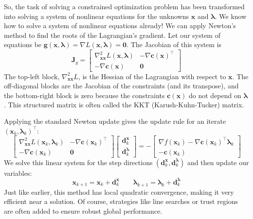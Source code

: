 So, the task of solving a constrained optimization problem has been transformed into solving a system of nonlinear equations for the unknowns $\mathbf{x}$ and $\boldsymbol{\lambda}$. We know how to solve a system of nonlinear equations already! We can apply Newton's method to find the roots of the Lagrangian's gradient. Let our system of equations be $\mathbf{g}(\mathbf{x}, \boldsymbol{\lambda}) = \nabla L(\mathbf{x}, \boldsymbol{\lambda}) = \mathbf{0}$. The Jacobian of this system is
\begin{equation}
\mathbf{J}_{g} = \begin{bmatrix} 
\nabla_{\mathbf{xx}}^2 L(\mathbf{x}, \boldsymbol{\lambda}) & -\nabla \mathbf{c}(\mathbf{x})^{\top} \\ 
- \nabla \mathbf{c}(\mathbf{x}) & \mathbf{0} 
\end{bmatrix}
\end{equation}
The top-left block, $\nabla_{\mathbf{xx}}^2 L$, is the Hessian of the Lagrangian with respect to $\mathbf{x}$. The off-diagonal blocks are the Jacobian of the constraints (and its transpose), and the bottom-right block is zero because the constraints $\mathbf{c}(\mathbf{x})$ do not depend on $\boldsymbol{\lambda}$. This structured matrix is often called the KKT (Karush-Kuhn-Tucker) matrix.

Applying the standard Newton update gives the update rule for an iterate $(\mathbf{x}_k, \boldsymbol{\lambda}_k)^{\top}$:
\begin{equation}
\begin{bmatrix} 
\nabla_{\mathbf{xx}}^2 L(\mathbf{x}_k, \boldsymbol{\lambda}_k) & -\nabla \mathbf{c}(\mathbf{x}_k)^{\top} \\ 
- \nabla \mathbf{c}(\mathbf{x}_k) & \mathbf{0} 
\end{bmatrix}
\begin{bmatrix} 
\mathbf{d}_k^{\mathbf{x}} \\ 
\mathbf{d}_k^{\boldsymbol{\lambda}} 
\end{bmatrix} =
- \begin{bmatrix} 
\nabla f(\mathbf{x}_k) - \nabla \mathbf{c}(\mathbf{x}_k)^{\top} \boldsymbol{\lambda}_k \\ 
-\mathbf{c}(\mathbf{x}_k) 
\end{bmatrix}
\end{equation}
We solve this linear system for the step directions $(\mathbf{d}_k^{\mathbf{x}}, \mathbf{d}_k^{\boldsymbol{\lambda}})$ and then update our variables:
\begin{equation}
\mathbf{x}_{k+1} = \mathbf{x}_k + \mathbf{d}_k^{\mathbf{x}} \qquad \boldsymbol{\lambda}_{k+1} = \boldsymbol{\lambda}_k + \mathbf{d}_k^{\boldsymbol{\lambda}}
\end{equation}
Just like earlier, this method has local quadratic convergence, making it very efficient near a solution. Of course, strategies like line searches or trust regions are often added to ensure robust global performance.

